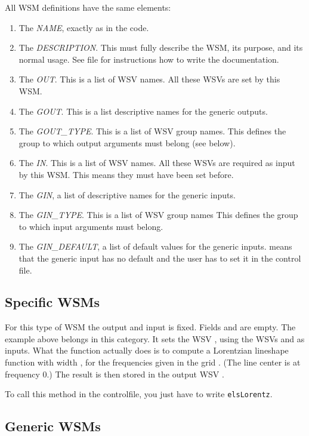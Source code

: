 \noindent
All WSM definitions have the same elements:
\begin{enumerate}
\item The \emph{NAME}, exactly as in the code.
\item The \emph{DESCRIPTION}. This must fully describe the WSM, its
  purpose, and its normal usage. See file  for
  instructions how to write the documentation.
\item The \emph{OUT}. This is a list of WSV names.
All these WSVs are set by this WSM.
\item The \emph{GOUT}. This is a list descriptive names for the generic
outputs.
\item The \emph{GOUT\_TYPE}. This is a list of WSV group names.
This defines the group to which output arguments must belong (see below).
\item The \emph{IN}. This is a list of WSV names.
All these WSVs are required as input by this WSM. This means they must have
been set before.
\item The \emph{GIN}, a list of descriptive names for the generic inputs.
\item The \emph{GIN\_TYPE}. This is a list of WSV group names
This defines the group to which input arguments must belong.
\item The \emph{GIN\_DEFAULT}, a list of default values for the generic inputs.
 means that the generic input has no default and the user has
to set it in the control file.
\end{enumerate}

\subsection{Specific WSMs}

For this type of WSM the output and input is fixed. Fields
 and  are empty. The example
above belongs in this category. It sets the WSV , using
the WSVs  and  as
inputs. What the function actually does is to compute a Lorentzian
lineshape function with width , for the
frequencies given in the grid . (The line center
is at frequency 0.) The result is then stored in the output WSV
. 

To call this method in the controlfile, you just have to write
\verb|elsLorentz|. 

\subsection{Generic WSMs}

